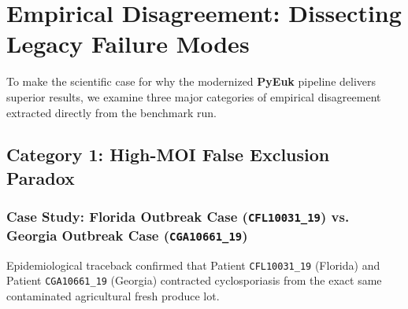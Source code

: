 \documentclass[11pt,a4paper]{article}
\begin{document}
\section{Empirical Disagreement: Dissecting Legacy Failure Modes}

To make the scientific case for why the modernized \textbf{PyEuk} pipeline delivers superior results, we examine three major categories of empirical disagreement extracted directly from the benchmark run.

\subsection{Category 1: High-MOI False Exclusion Paradox}

\subsubsection{Case Study: Florida Outbreak Case (\texttt{CFL10031\_19}) vs. Georgia Outbreak Case (\texttt{CGA10661\_19})}
Epidemiological traceback confirmed that Patient \texttt{CFL10031\_19} (Florida) and Patient \texttt{CGA10661\_19} (Georgia) contracted cyclosporiasis from the exact same contaminated agricultural fresh produce lot.
\end{document}
